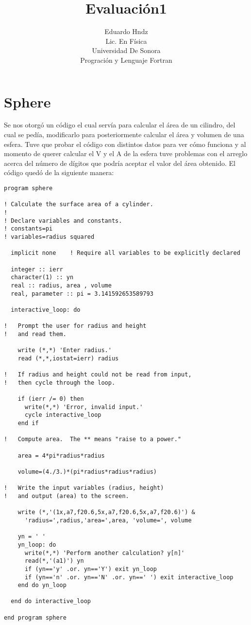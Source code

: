 \documentclass{article}
\title{Evaluación1}
\author{Eduardo Hndz\\Lic. En Física\\Universidad De Sonora\\ Progración y Lenguaje Fortran}
\begin{document}
\maketitle
\section{Sphere}
Se nos otorgó un código el cual servía para calcular el área de un cilindro, del cual se pedía, modificarlo para posteriormente calcular el área y volumen de una esfera.
Tuve que probar el código con distintos datos para ver cómo funciona y al momento de querer calcular el V y el A de la esfera tuve problemas con el arreglo acerca del número de dígitos que podría aceptar el valor del área obtenido. El código quedó de la siguiente manera:
\begin{verbatim}
program sphere

! Calculate the surface area of a cylinder.
!
! Declare variables and constants.
! constants=pi
! variables=radius squared 

  implicit none    ! Require all variables to be explicitly declared

  integer :: ierr
  character(1) :: yn
  real :: radius, area , volume
  real, parameter :: pi = 3.141592653589793

  interactive_loop: do

!   Prompt the user for radius and height
!   and read them.

    write (*,*) 'Enter radius.'
    read (*,*,iostat=ierr) radius

!   If radius and height could not be read from input,
!   then cycle through the loop.

    if (ierr /= 0) then
      write(*,*) 'Error, invalid input.'
      cycle interactive_loop
    end if

!   Compute area.  The ** means "raise to a power."

    area = 4*pi*radius*radius

    volume=(4./3.)*(pi*radius*radius*radius)

!   Write the input variables (radius, height)
!   and output (area) to the screen.

    write (*,'(1x,a7,f20.6,5x,a7,f20.6,5x,a7,f20.6)') &
      'radius=',radius,'area=',area, 'volume=', volume

    yn = ' '
    yn_loop: do
      write(*,*) 'Perform another calculation? y[n]'
      read(*,'(a1)') yn
      if (yn=='y' .or. yn=='Y') exit yn_loop
      if (yn=='n' .or. yn=='N' .or. yn==' ') exit interactive_loop
    end do yn_loop

  end do interactive_loop

end program sphere

\end{verbatim}
\end{document}
